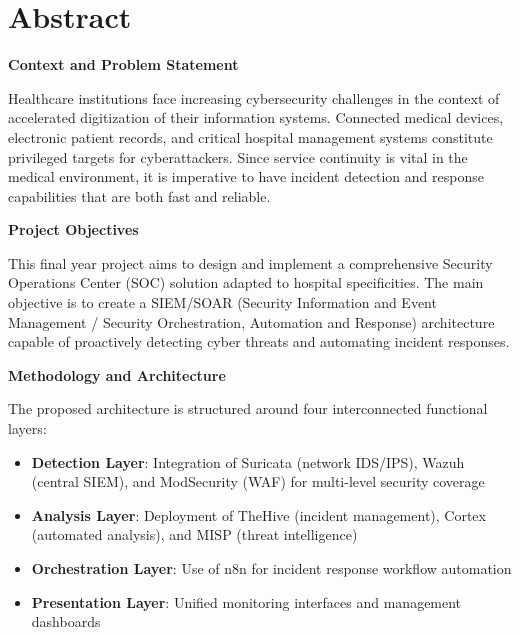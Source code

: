 \chapter*{Abstract}

\vspace{1cm}

\textbf{Context and Problem Statement}

Healthcare institutions face increasing cybersecurity challenges in the context of accelerated digitization of their information systems. Connected medical devices, electronic patient records, and critical hospital management systems constitute privileged targets for cyberattackers. Since service continuity is vital in the medical environment, it is imperative to have incident detection and response capabilities that are both fast and reliable.

\vspace{0.5cm}

\textbf{Project Objectives}

This final year project aims to design and implement a comprehensive Security Operations Center (SOC) solution adapted to hospital specificities. The main objective is to create a SIEM/SOAR (Security Information and Event Management / Security Orchestration, Automation and Response) architecture capable of proactively detecting cyber threats and automating incident responses.
\vspace{0.5cm}

\textbf{Methodology and Architecture}

The proposed architecture is structured around four interconnected functional layers:

\begin{itemize}
    \item \textbf{Detection Layer}: Integration of Suricata (network IDS/IPS), Wazuh (central SIEM), and ModSecurity (WAF) for multi-level security coverage
    \item \textbf{Analysis Layer}: Deployment of TheHive (incident management), Cortex (automated analysis), and MISP (threat intelligence)
    \item \textbf{Orchestration Layer}: Use of n8n for incident response workflow automation
    \item \textbf{Presentation Layer}: Unified monitoring interfaces and management dashboards
\end{itemize}

\vspace{0.5cm}

